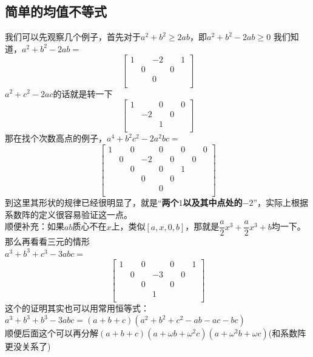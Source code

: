 \documentclass[UTF8]{ctexart}
\begin{document}
\subsection{简单的均值不等式}
我们可以先观察几个例子，首先对于$ a^{2}+b^{2}\geq2ab $，即$ a^{2}+b^{2}-2ab\geq0 $
我们知道，$ a^{2}+b^{2}-2ab= $
\renewcommand*{\arraystretch}{1.732}\[\left[\begin{matrix}
	1& & -2& &1 \\
	& 0& &0 & \\
	& & 0& & \\
\end{matrix}\right]\]
$ a^{2}+c^{2}-2ac $的话就是转一下
\renewcommand*{\arraystretch}{1.732}\[\left[\begin{matrix}
	1& & 0& &0 \\
	& -2& &0 & \\
	& & 1& & \\
\end{matrix}\right]\]
那在找个次数高点的例子，$ a^{4}+b^{2}c^{2}-2a^{2}bc= $
\renewcommand*{\arraystretch}{1.732}\[\left[\begin{matrix}
	1& & 0& &0& & 0& &0\\
    & 0& & -2&&0 & & 0&\\
    & & 0& &0& & 1& &\\
    & & & 0&& 0& & &\\
    & & & &0& & & &\\
\end{matrix}\right]\]
到这里其形状的规律已经很明显了，就是“\textbf{两个$ 1 $以及其中点处的$ -2 $}”，实际上根据系数阵的定义很容易验证这一点。\\
顺便补充：如果$ ab $质心不在$ x $上，类似$[a,x,0,b] $，那就是$ \dfrac{a}{2}x^{3}+\dfrac{a}{2}x^{3}+b $均一下。\\
那么再看看三元的情形\\
$ a^{3}+b^{3}+c^{3}-3abc= $
\renewcommand*{\arraystretch}{1.732}\[\left[\begin{matrix}
	1& & 0& &0& & 1\\
	& 0& & -3& &0 &\\
	& & 0& &0& & \\
	& & & 1& & &\\
\end{matrix}\right]\]
这个的证明其实也可以用常用恒等式：\\
$ a^{3}+b^{3}+b^{3}-3 abc=(a+b+c)(a^{2}+b^{2}+c^{2}-ab-ac-bc) $\\
顺便后面这个可以再分解$ (a+b+c)(a+\omega b+\omega ^{2}c)(a+\omega ^{2} b+\omega c) $(和系数阵更没关系了)\\
\end{document}
